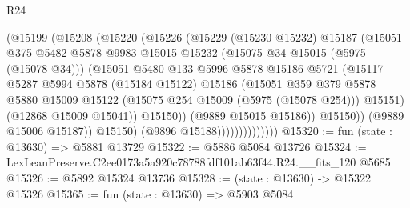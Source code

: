 \begin{lexlean}{R24}
\begin{coremodule}
                              (@15199
                                (@15208
                                  (@15220
                                    (@15226
                                      (@15229
                                        (@15230 @15232)
                                        @15187
                                        (@15051
                                          @375
                                          @5482
                                          @5878
                                          @9983
                                          @15015
                                          @15232
                                          (@15075 @34 @15015 (@5975 (@15078 @34)))
                                          (@15051
                                            @5480
                                            @133
                                            @5996
                                            @5878
                                            @15186
                                            @5721
                                            (@15117
                                              @5287
                                              @5994
                                              @5878
                                              (@15184 @15122)
                                              @15186
                                              (@15051
                                                @359
                                                @379
                                                @5878
                                                @5880
                                                @15009
                                                @15122
                                                (@15075 @254 @15009 (@5975 (@15078 @254)))
                                                @15151)
                                              (@12868 @15009 @15041))
                                            @15150))
                                        (@9889 @15015 @15186))
                                      @15150))
                                  (@9889 @15006 @15187))
                                @15150)
                              (@9896 @15188))))))))))))))
@15320 := fun (state : @13630) => @5881 @13729
@15322 := @5886 @5084 @13726
@15324 := LexLeanPreserve.C2ee0173a5a920c78788fdf101ab63f44.R24.__fits_120 @5685
@15326 := @5892 @15324 @13736
@15328 := (state : @13630) -> @15322 @15326
@15365 := fun (state : @13630) =>
  @5903
    @5084

\end{coremodule}
\end{lexlean}
